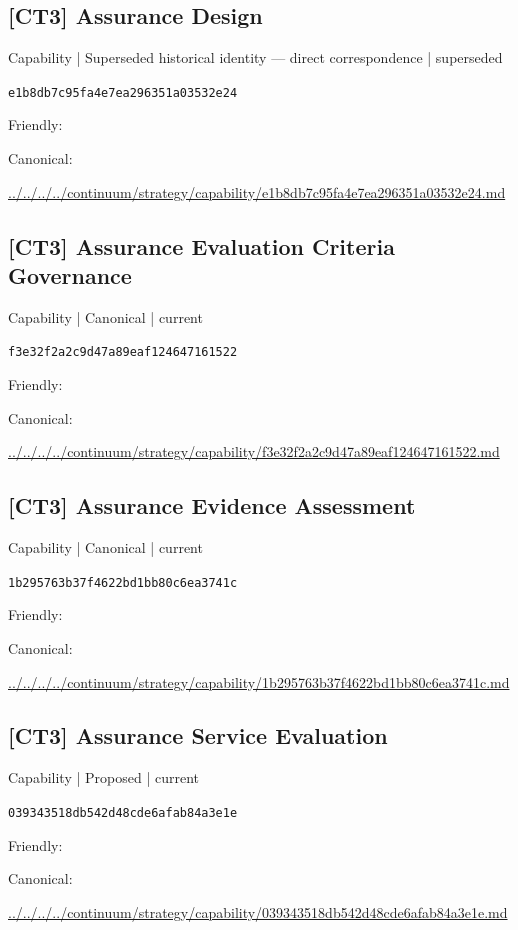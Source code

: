 \documentclass[10pt,a4paper]{article}
\begin{document}
\subsection*{[CT3] Assurance Design}
{\small Capability | Superseded historical identity — direct correspondence | superseded}\par
\texttt{e1b8db7c95fa4e7ea296351a03532e24}\par
Friendly: \par
Canonical: \par
{\footnotesize\url{../../../../continuum/strategy/capability/e1b8db7c95fa4e7ea296351a03532e24.md}}\par
\subsection*{[CT3] Assurance Evaluation Criteria Governance}
{\small Capability | Canonical | current}\par
\texttt{f3e32f2a2c9d47a89eaf124647161522}\par
Friendly: \par
Canonical: \par
{\footnotesize\url{../../../../continuum/strategy/capability/f3e32f2a2c9d47a89eaf124647161522.md}}\par
\subsection*{[CT3] Assurance Evidence Assessment}
{\small Capability | Canonical | current}\par
\texttt{1b295763b37f4622bd1bb80c6ea3741c}\par
Friendly: \par
Canonical: \par
{\footnotesize\url{../../../../continuum/strategy/capability/1b295763b37f4622bd1bb80c6ea3741c.md}}\par
\subsection*{[CT3] Assurance Service Evaluation}
{\small Capability | Proposed | current}\par
\texttt{039343518db542d48cde6afab84a3e1e}\par
Friendly: \par
Canonical: \par
{\footnotesize\url{../../../../continuum/strategy/capability/039343518db542d48cde6afab84a3e1e.md}}\par
\end{document}
